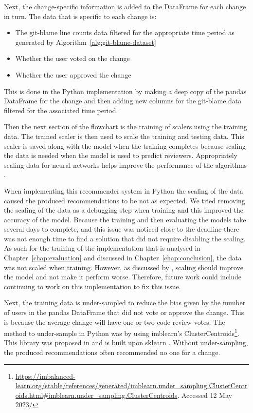 Next, the change-specific information is added to the DataFrame for each change in turn. The data that is specific to each change is:
\begin{itemize}
    \item The git-blame line counts data filtered for the appropriate time period as generated by Algorithm~\ref{alg:git-blame-dataset}
    \item Whether the user voted on the change
    \item Whether the user approved the change
\end{itemize}

This is done in the Python implementation by making a deep copy of the pandas DataFrame for the change and then adding new columns for the git-blame data filtered for the associated time period.

Then the next section of the flowchart is the training of scalers using the training data. The trained scaler is then used to scale the training and testing data. This scaler is saved along with the model when the training completes because scaling the data is needed when the model is used to predict reviewers. Appropriately scaling data for neural networks helps improve the performance of the algorithms \citep{medium:importance-of-feature-scaling}. 

\label{para:training-when-scaling-caused-issues}When implementing this recommender system in Python the scaling of the data caused the produced recommendations to be not as expected. We tried removing the scaling of the data as a debugging step when training and this improved the accuracy of the model. Because the training and then evaluating the models take several days to complete, and this issue was noticed close to the deadline there was not enough time to find a solution that did not require disabling the scaling. As such for the training of the implementation that is analysed in Chapter~\ref{chap:evaluation} and discussed in Chapter~\ref{chap:conclusion}, the data was not scaled when training. However, as discussed by \cite{medium:importance-of-feature-scaling}, scaling should improve the model and not make it perform worse. Therefore, future work could include continuing to work on this implementation to fix this issue.

Next, the training data is under-sampled to reduce the bias given by the number of users in the pandas DataFrame that did not vote or approve the change. This is because the average change will have one or two code review votes. The method to under-sample in Python was by using imblearn's ClusterCentroids\footnote{\def\UrlBreaks{\do\/\do-\do.}\url{https://imbalanced-learn.org/stable/references/generated/imblearn.under\_sampling.ClusterCentroids.html\#imblearn.under\_sampling.ClusterCentroids}. Accessed 12 May 2023/\def\UrlBreaks{\do\/\do-}}. This library was proposed in \cite{JMLR:v18:16-365} and is built upon sklearn \citep[p. 1]{JMLR:v18:16-365}. Without under-sampling, the produced recommendations often recommended no one for a change.

